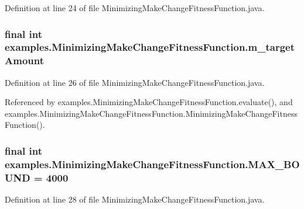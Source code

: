 Definition at line 24 of file Minimizing\-Make\-Change\-Fitness\-Function.\-java.

\hypertarget{classexamples_1_1_minimizing_make_change_fitness_function_abc135156a658dd9e1d495b1621233b49}{
\subsubsection[{m\-\_\-target\-Amount}]{\setlength{\rightskip}{0pt plus 5cm}final int examples.\-Minimizing\-Make\-Change\-Fitness\-Function.\-m\-\_\-target\-Amount\hspace{0.3cm}{\ttfamily [private]}}}\label{classexamples_1_1_minimizing_make_change_fitness_function_abc135156a658dd9e1d495b1621233b49}


Definition at line 26 of file Minimizing\-Make\-Change\-Fitness\-Function.\-java.



Referenced by examples.\-Minimizing\-Make\-Change\-Fitness\-Function.\-evaluate(), and examples.\-Minimizing\-Make\-Change\-Fitness\-Function.\-Minimizing\-Make\-Change\-Fitness\-Function().

\hypertarget{classexamples_1_1_minimizing_make_change_fitness_function_ace5118d4c00bde2d1c191322a46ceefb}{
\subsubsection[{M\-A\-X\-\_\-\-B\-O\-U\-N\-D}]{\setlength{\rightskip}{0pt plus 5cm}final int examples.\-Minimizing\-Make\-Change\-Fitness\-Function.\-M\-A\-X\-\_\-\-B\-O\-U\-N\-D = 4000\hspace{0.3cm}{\ttfamily [static]}}}\label{classexamples_1_1_minimizing_make_change_fitness_function_ace5118d4c00bde2d1c191322a46ceefb}


Definition at line 28 of file Minimizing\-Make\-Change\-Fitness\-Function.\-java.



